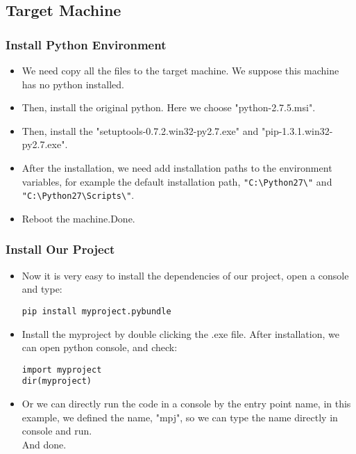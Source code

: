 \newpage
\subsection{Target Machine}
\subsubsection{Install Python Environment}
\begin{itemize}
\item
We need copy all the files to the target machine. We suppose this machine has no python installed.
\item
Then, install the original python. Here we choose "python-2.7.5.msi".
\item
Then, install the "setuptools-0.7.2.win32-py2.7.exe" and "pip-1.3.1.win32-py2.7.exe".
\item
After the installation, we need add installation paths to the environment variables, 
for example the default installation path, \verb/"C:\Python27\"/ and \verb/"C:\Python27\Scripts\"/.
\item
Reboot the machine.Done.
\end{itemize}
\subsubsection{Install Our Project}
\begin{itemize}
\item
Now it is very easy to install the dependencies of our project, open a console and type:
\begin{lstlisting}
pip install myproject.pybundle
\end{lstlisting}
\item
Install the myproject by double clicking the .exe file.
After installation, we can open python console, and check:
\begin{lstlisting}
import myproject
dir(myproject)
\end{lstlisting}
\item
Or we can directly run the code in a console by the entry point name,
in this example, we defined the name, "mpj", so we can type the name directly in console and run. \\
And done.
\end{itemize}




